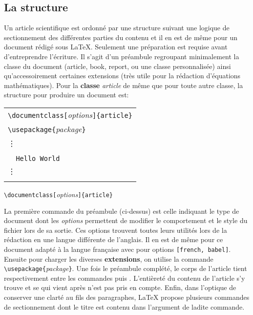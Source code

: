 \subsection{La structure}
Un article scientifique est ordonné par une structure suivant une logique de sectionnement des différentes parties du contenu et il en est de même pour un document rédigé sous \LaTeX. Seulement une préparation est requise avant d'entreprendre l'écriture. Il s'agit d'un préambule regroupant minimalement la classe du document (article, book, report, ou une classe personnalisée) ainsi qu'accessoirement certaines extensions (très utile pour la rédaction d'équations mathématiques). Pour la \textbf{classe} \emph{article} de même que pour toute autre classe, la structure pour produire un document est:
%	
\begin{table}[H]
	\centering
	\begin{tabular}{l}
		\hline
		\verb|\documentclass[|\textit{options}\verb|]|\verb|{article}|\\
		\verb|\usepackage{|\textit{package}\verb|}|\\
		\vdots\\
		\verb||\\
		\verb|	Hello World|\\
		\vdots\\
		\verb||\\
		\hline
	\end{tabular}
\end{table}
%
\begin{center}
	\verb|\documentclass[|\textit{options}\verb|]|\verb|{article}|
\end{center}
%
\par La première commande du préambule (ci-dessus) est celle
indiquant le type de document dont les \textit{options} permettent de modifier le comportement et le style du fichier lors de sa sortie. Ces options trouvent toutes leurs utilités lors de la rédaction en une langue différente de l'anglais. Il en est de même pour ce document adapté à la langue française avec pour options \verb|[french, babel]|. Ensuite pour charger les diverses \textbf{extensions}, on utilise la commande \verb|\usepackage{|\textit{package}\verb|}|. Une fois le préambule complété,  le corps de l'article tient respectivement entre les commandes \verb|| puis \verb||. L'entièreté du contenu de l'article s'y trouve et se qui vient après n'est pas pris en compte. Enfin, dans l'optique de conserver une clarté au fils des paragraphes, \LaTeX{} propose plusieurs commandes de sectionnement dont le titre est contenu dans l'argument de ladite commande.
